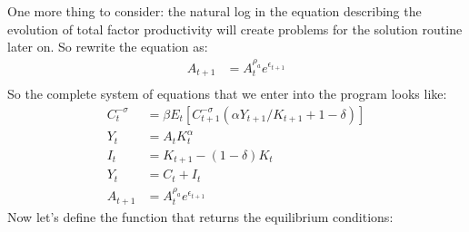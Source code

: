 \documentclass[letterpaper,10pt,openany,oneside,english]{sphinxmanual}
\begin{document}
One more thing to consider: the natural log in the equation describing
the evolution of total factor productivity will create problems for the
solution routine later on. So rewrite the equation as:
\label{\detokenize{examples:equation-examples:6}}\label{equation:examples:examples:6}\begin{align}
A_{t+1} & =  A_{t}^{\rho_a}e^{\epsilon_{t+1}}\\
\end{align}
So the complete system of equations that we enter into the program looks
like:
\label{\detokenize{examples:equation-examples:7}}\label{equation:examples:examples:7}\begin{align}
C_t^{-\sigma} & = \beta E_t \left[C_{t+1}^{-\sigma}(\alpha Y_{t+1} /K_{t+1}+ 1 - \delta)\right]\\
Y_t & = A_t K_t^{\alpha}\\
I_t & = K_{t+1} - (1-\delta)K_t\\
Y_t & = C_t + I_t\\
A_{t+1} & =  A_{t}^{\rho_a}e^{\epsilon_{t+1}}
\end{align}
Now let's define the function that returns the equilibrium conditions:
\end{document}
